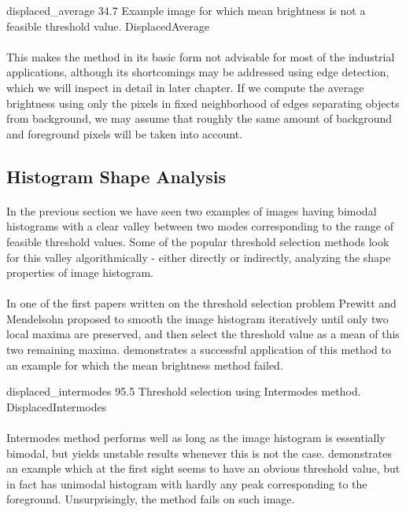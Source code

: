 \thresholdFigure
{displaced_average}
{34.7}
{Example image for which mean brightness is not a feasible threshold value.}
{DisplacedAverage}

\paragraph*{}
This makes the method in its basic form not advisable for most of the industrial applications, although its shortcomings may be addressed using edge detection, which we will inspect in detail in later chapter. If we compute the average brightness using only the pixels in fixed neighborhood of edges separating objects from background, we may assume that roughly the same amount of background and foreground pixels will be taken into account.


\subsection{Histogram Shape Analysis}

\paragraph*{}
In the previous section we have seen two examples of images having bimodal histograms with a clear valley between two modes corresponding to the range of feasible threshold values. Some of the popular threshold selection methods look for this valley algorithmically - either directly or indirectly, analyzing the shape properties of image histogram. 

\paragraph*{}
In one of the first papers\cite{PrewittMendelsohn66} written on the threshold selection problem Prewitt and Mendelsohn proposed to smooth the image histogram iteratively until only two local maxima are preserved, and then select the threshold value as a mean of this two remaining maxima.  demonstrates a successful application of this method to an example for which the mean brightness method failed.

\thresholdFigure
{displaced_intermodes}
{95.5}
{Threshold selection using Intermodes method.}
{DisplacedIntermodes}

\paragraph*{}
Intermodes method performs well as long as the image histogram is essentially bimodal, but yields unstable results whenever this is not the case.  demonstrates an example which at the first sight seems to have an obvious threshold value, but in fact has unimodal histogram with hardly any peak corresponding to the foreground. Unsurprisingly, the method fails on such image.

